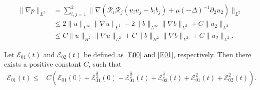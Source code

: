 \documentclass[10pt,a4paper]{amsart}
\begin{document}
\begin{align}\label{P}
\|\nabla p\|_{L^2}&=\sum_{i,j=1}^2\|\nabla\left(\mathcal{R}_i\mathcal{R}_j(u_i u_j-b_i b_j)+\mu{(-\Delta)}^{-1}\partial_2u_2\right)\|_{L^2}\nonumber\\
&\leq2\|u\|_{L^\infty}\|\nabla u\|_{L^{2}}+2\|b\|_{L^\infty}\|\nabla b\|_{L^{2}}+C\|u_2\|_{L^2}\nonumber\\
&\leq C\|u\|_{H^2}\|\nabla u\|_{L^{2}}+C\|b\|_{H^2}\|\nabla b\|_{L^{2}}+C\|u_2\|_{L^2}.
\end{align}

\begin{Prop}\label{Pro11}
Let $\mathcal{E}_{01}(t)$ and $\mathcal{E}_{02}(t)$ be defined as \eqref{E00} and \eqref{E01}, respectively. Then there exists a positive constant $C$, such that
\begin{align}\label{in3.1}
\mathcal{E}_{01}(t)\leq& C\left(\mathcal{E}_{01}(0)+\mathcal{E}_{01}^{\frac{3}{2}}(0)+\mathcal{E}_{01}^{\frac{3}{2}}(t)+\mathcal{E}_{02}^{\frac{3}{2}}(t)+\mathcal{E}_{01}^{2}(t)+\mathcal{E}_{02}^{2}(t)\right).
\end{align}
\end{Prop}
\end{document}

